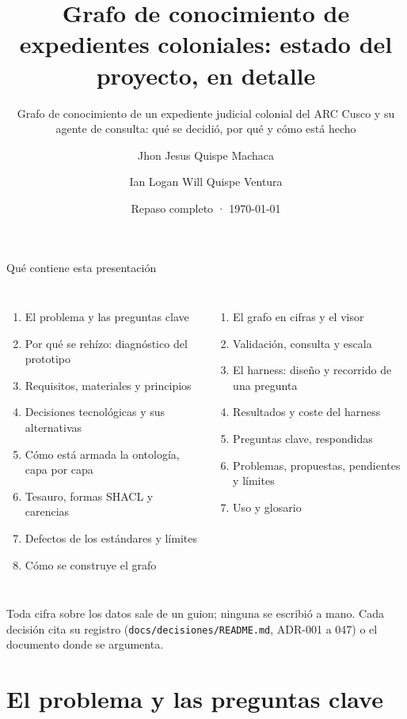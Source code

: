 \documentclass[aspectratio=169,10pt]{beamer}
\title{Grafo de conocimiento de expedientes coloniales: estado del proyecto, en detalle}
\subtitle{Grafo de conocimiento de un expediente judicial colonial del ARC Cusco y su agente de consulta:
qué se decidió, por qué y cómo está hecho}
\author{Jhon Jesus Quispe Machaca \and Ian Logan Will Quispe Ventura}
\institute{Laboratorio LAAD · Universidad Nacional de San Antonio Abad del Cusco}
\date{Repaso completo · \today}
\newcommand{\ttt}[1]{\texttt{\small #1}}
\begin{document}
\maketitle

\begin{frame}{Qué contiene esta presentación}
\begin{columns}[T]
\begin{enumerate}\small
\item El problema y las preguntas clave
\item Por qué se rehízo: diagnóstico del prototipo
\item Requisitos, materiales y principios
\item Decisiones tecnológicas y sus alternativas
\item Cómo está armada la ontología, capa por capa
\item Tesauro, formas SHACL y carencias
\item Defectos de los estándares y límites
\item Cómo se construye el grafo
\end{enumerate}
\begin{enumerate}\small\setcounter{enumi}{8}
\item El grafo en cifras y el visor
\item Validación, consulta y escala
\item El harness: diseño y recorrido de una pregunta
\item Resultados y coste del harness
\item Preguntas clave, respondidas
\item Problemas, propuestas, pendientes y límites
\item Uso y glosario
\end{enumerate}
\end{columns}
\medskip
\footnotesize Toda cifra sobre los datos sale de un guion; ninguna se escribió a mano. Cada decisión cita su registro
(\ttt{docs/decisiones/README.md}, ADR-001 a 047) o el documento donde se argumenta.
\end{frame}

\section{El problema y las preguntas clave}
\end{document}
